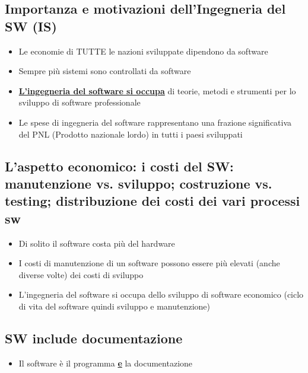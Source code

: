\subsection{Importanza e motivazioni dell’Ingegneria del SW (IS)}
\begin{itemize}
    \item Le economie di TUTTE le nazioni sviluppate dipendono da software
    \item Sempre più sistemi sono controllati da software
    \item \textbf{\underline{L'ingegneria del software si occupa}} di teorie, metodi e strumenti per lo sviluppo di software professionale
    \item Le spese di ingegneria del software rappresentano una frazione significativa del PNL (Prodotto nazionale lordo) in tutti i paesi sviluppati
\end{itemize}

\subsection{L’aspetto economico: i costi del SW: manutenzione vs. sviluppo; costruzione vs. testing; distribuzione dei costi dei vari processi sw}
\begin{itemize}
    \item Di solito il software costa più del hardware
    \item I costi di manutenzione di un software possono essere più elevati (anche diverse volte) dei costi di sviluppo
    \item L'ingegneria del software si occupa dello sviluppo di software economico (ciclo di vita del software quindi sviluppo e manutenzione)
\end{itemize}

\subsection{SW include documentazione}
\begin{itemize}
    \item Il software è il programma \textbf{\underline{e}} la documentazione
\end{itemize}

